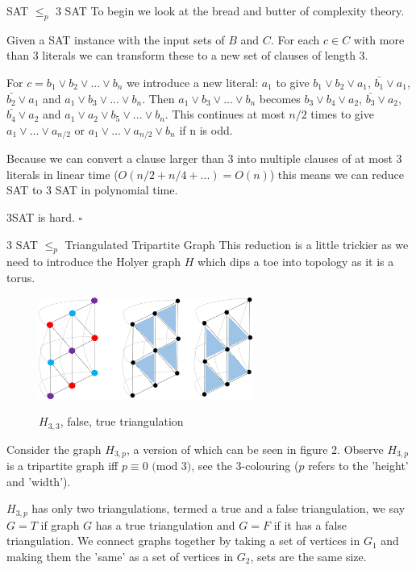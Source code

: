 \documentclass[final]{beamer}
\newlength{\colwidth}
\newcounter{col}
\begin{document}
\begin{frame}[t]
\begin{columns}[t]
\begin{column}{\colwidth}
\begin{block}{SAT $\leq_p$ 3 SAT}
To begin we look at the bread and butter of complexity theory.

Given a SAT instance with the input sets of $B$ and $C$. For each $c \in C$ with more than 3 literals we can transform these to a new set of clauses of length 3. 

For $c = b_1 \lor b_2 \lor ... \lor b_n$ we introduce a new literal: $a_1$ to give $b_1 \lor b_2 \lor a_1$, $\bar{b_1} \lor a_1$, $\bar{b_2} \lor a_1$ and $a_1 \lor b_3 \lor ... \lor b_n$. Then $a_1 \lor b_3 \lor ... \lor b_n$ becomes $b_3 \lor b_4 \lor a_2$, $\bar{b_3} \lor a_2$, $\bar{b_4} \lor a_2$ and $a_1 \lor a_2 \lor b_5 \lor ... \lor b_n$. This continues at most $n/2$ times to give $a_1 \lor ... \lor a_{n/2}$ or $a_1 \lor ... \lor a_{n/2} \lor b_n$ if n is odd. 

Because we can convert a clause larger than 3 into multiple clauses of at most 3 literals in linear time ($O(n/2 + n/4 + ...) = O(n)$) this means we can reduce SAT to 3 SAT in polynomial time. 

3SAT is hard. $\square$

  \end{block}
  \begin{block}{3 SAT $\leq_p$ Triangulated Tripartite Graph \cite{doi:10.1137/0210054}}
This reduction is a little trickier as we need to introduce the Holyer graph $H$ which dips a toe into topology as it is a torus.

\begin{figure}
		\vspace{-15pt}
		\includegraphics[width=70mm]{holyer_graph.png}
		\label{fig:holyer}
		\caption{$H_{3,3}$, false, true triangulation}
		\vspace{-15pt}
\end{figure}

Consider the graph $H_{3,p}$, a version of which can be seen in figure 2. Observe $H_{3,p}$ is a tripartite graph iff $p\equiv0 \text{ (mod }3)$, see the 3-colouring ($p$ refers to the 'height' and 'width').

		

$H_{3,p}$ has only two triangulations, termed a true and a false triangulation, we say $G=T$ if graph $G$ has a true triangulation and $G=F$ if it has a false triangulation. We connect graphs together by taking a set of vertices in $G_1$ and making them the 'same' as a set of vertices in $G_2$, sets are the same size.



\end{block}
\end{column}
\end{columns}
\end{frame}
\end{document}
